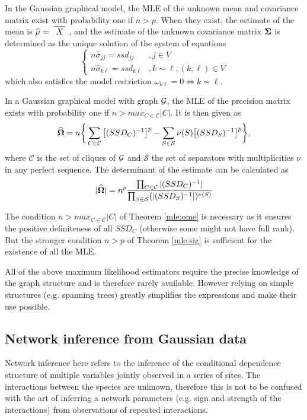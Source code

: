 \begin{theorem}\label{mle:sig}
In the Gaussian graphical model,  the MLE of the unknown mean and covariance matrix exist with probability one if $n>p$. When they exist, the estimate of the mean is $\widehat{\mu} = \xbar{X}$, and the estimate of the unknown covariance matrix ${\boldsymbol{\Sigma}}$ is determined as the unique solution of the system of equations
\begin{equation*}
 \left\{
 \begin{array}{rl}
 n\widehat{\sigma}_{jj} = ssd_{jj}&, j\in V\\
 n\widehat{\sigma}_{k\ell} = ssd_{k\ell}&, k\sim\ell, (k,\ell) \in V
 \end{array} \right.
\end{equation*}  
which also satisfies the model restriction $\omega_{k\ell} =0 \iff k\nsim \ell $.
\end{theorem}

\begin{theorem}\label{mle:ome}
In a Gaussian graphical model with graph $\mathcal{G}$, the MLE of the precision matrix exists with probability one if $n>max_{C\in\mathcal{C}}|C|$. It is then given as
$$\widehat{{\boldsymbol{\Omega}}} = n \bigg\{\sum_{C\in\mathcal{C}} \big[(SSD_C)^{-1}\big]^p-\sum_{S\in\mathcal{S}} \nu(S) \big[(SSD_S)^{-1}\big]^p\bigg\},$$
where $\mathcal{C}$ is the set of cliques of $\mathcal{G}$ and $\mathcal{S}$ the set of separators with multiplicities $\nu$ in any perfect sequence. The determinant of the estimate can be calculated as
$$|\widehat{{\boldsymbol{\Omega}}}| = n^p \dfrac{\prod_{C\in\mathcal{C}}|(SSD_C)^{-1}|}{\prod_{S\in\mathcal{S}} (|(SSD_S)^{-1}|)^{\nu(S)}}$$
\end{theorem}
 
The condition $n>max_{C\in\mathcal{C}}|C|$ of Theorem \ref{mle:ome} is necessary as it ensures the positive definiteness of all $SSD_C$ (otherwise some might not have full rank). But the stronger condition $n>p$ of Theorem \ref{mle:sig} is sufficient for the existence of all the MLE. 

 All of the above maximum likelihood estimators require the precise knowledge of the graph structure and is therefore rarely available. However relying on simple structures (e.g. spanning trees) greatly simplifies the expressions and make their use possible.

\subsection{Network inference from Gaussian data}
  Network inference here refers to the inference of the conditional dependence structure of multiple variables jointly observed in a series of sites. The interactions between the species are unknown, therefore this is not to be confused with the art of inferring a network parameters (e.g. sign and strength of the interactions) from observations of repeated interactions.
  
